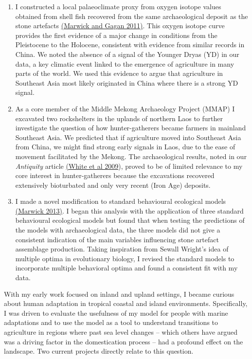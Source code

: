 \documentclass[11pt,article,oneside]{memoir}
\begin{document}
\begin{enumerate}

\item  I constructed a local palaeoclimate proxy from oxygen isotope values obtained from shell fish recovered from the same archaeological deposit as the stone artefacts {\href{http://faculty.washington.edu/bmarwick/PDFs/Marwick_and_Gagan_2011_QSR.pdf}{(Marwick and Gagan 2011)}}. This oxygen isotope curve provides the first evidence of a major change in conditions from the Pleistocene to the Holocene,  consistent with evidence from similar records in China. We noted the absence of a signal of the Younger Dryas (YD) in our data, a key climatic event linked to the emergence of agriculture in many parts of the world. We used this evidence to argue that agriculture in Southeast Asia most likely originated in China where there is a strong YD signal.

\item As a core member of the Middle Mekong Archaeology Project (MMAP) I excavated two rockshelters in the uplands of northern Laos to further investigate the question of how hunter-gatherers became farmers in mainland Southeast Asia. We predicted that if agriculture moved into Southeast Asia from China, we might find strong early signals in Laos, due to the ease of movement facilitated by the Mekong.  The archaeological results, noted in our \textit{Antiquity} article {\href{http://antiquity.ac.uk/projgall/white/}{(White et al 2009})}, proved to be of limited relevance to my core interest in hunter-gatherers because the excavations recovered extensively bioturbated and only very recent (Iron Age) deposits. 

\item I made a novel modification to standard behavioural ecological models  {\href{http://faculty.washington.edu/bmarwick/PDFs/Marwick_2013_JAA.pdf}{(Marwick 2013)}}. I began this analysis with the application of three standard behavioural ecological models but found that when testing the predictions of the models with archaeological data, the three models did not give a consistent indication of the main variables influencing stone artefact assemblage production. Taking inspiration from Sewall Wright's idea of multiple optima in evolutionary biology, I revised the standard models to incorporate multiple behavioral optima and found a consistent fit with my data. 

\end{enumerate}

With my early work focused on inland and upland settings, I became curious about human adaptation in tropical coastal and island environments. Specifically, I was driven to evaluate the usefulness of my model for people with marine adaptations and to use the model as a tool to understand transitions to agriculture in regions where past sea level changes – which others have argued was a driving factor in the domestication process –  had a profound effect on the landscape. Two current projects directly relate to this question.
\end{document}
